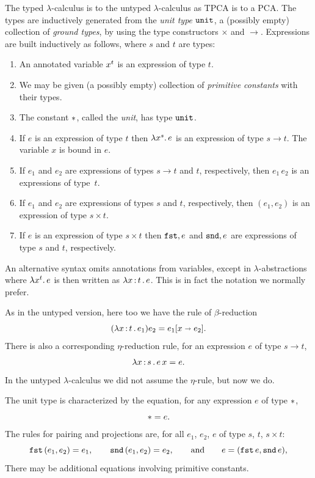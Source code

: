The typed $\lambda$-calculus is to the untyped $\lambda$-calculus as
TPCA is to a PCA. The types are inductively generated from the
\emph{unit type $\mathtt{unit}$}, a (possibly empty) collection of
\emph{ground types}, by using the type constructors $\times$ and
$\to$. Expressions are built inductively as follows, where $s$ and $t$
are types:
%
\begin{enumerate}
\item An annotated variable $x^{t}$ is an expression of type
  $t$.
\item We may be given (a possibly empty) collection of \emph{primitive
  constants} with their types.
\item The constant ${*}$, called the \emph{unit}, has type
  $\mathtt{unit}$.
\item If $e$ is an expression of type $t$ then
  $\lambda x^{s} .\,e$ is an expression of type $s \to t$. The
  variable $x$ is bound in $e$.
\item If $e_1$ and $e_2$ are expressions of types $s \to t$ and
  $t$, respectively, then $e_1\, e_2$ is an expressions of type~$t$.
\item If $e_1$ and $e_2$ are expressions of types $s$ and $t$,
  respectively, then $(e_1, e_2)$ is an expression of type $s \times
  t$.
\item If $e$ is an expression of type $s \times t$ then $\mathtt{fst},e$ and
  $\mathtt{snd},e$ are expressions of type $s$ and $t$, respectively.
\end{enumerate}
%
An alternative syntax omits annotations from variables, except in
$\lambda$-abstractions where $\lambda x^{t} .\,e$ is then written
as $\lambda x \,{:}\, t\,.\,e$. This is in fact the notation we normally prefer.

As in the untyped version, here too we have the rule of
$\beta$-reduction
%
\begin{equation*}
  (\lambda x \,{:}\, t\,.\,e_1) e_2 = e_1[x \shortrightarrow e_2].
\end{equation*}
%
There is also a corresponding $\eta$-reduction rule, for an expression
$e$ of type $s \to t$,
%
\begin{equation*}
  \lambda x \,{:}\, s\,.\,e\,x = e.
\end{equation*}
%
In the untyped $\lambda$-calculus we did not assume the $\eta$-rule,
but now we do.

The unit type is characterized by the equation, for any expression $e$
of type ${*}$,
%
\begin{equation*}
  {*} = e.
\end{equation*}
%
The rules for pairing and projections are, for all $e_1$, $e_2$, $e$
of type $s$, $t$, $s \times t$:
%
\begin{equation*}
  \mathtt{fst}\,(e_1, e_2) = e_1,
  \qquad
  \mathtt{snd}\,(e_1, e_2) = e_2,
  \qquad\text{and}\qquad
  e = (\mathtt{fst}\,e, \mathtt{snd}\,e),
\end{equation*}
%
There may be additional equations involving primitive constants.

